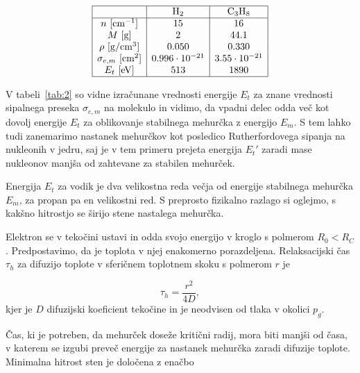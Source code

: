 \begin{table}
\label{tab:2}
  \centering
\[
    \begin{array}{|c|c|c|} \hline
      & \mathrm{H}_2 & \mathrm{C}_3 \mathrm{H}_8 \\ \hline
      n \ [ \mathrm{cm}^{-1}] & 15 & 16 \\
      M \ [\mathrm{g}] & 2 & 44.1 \\
      \rho \ [\mathrm{g}/ \mathrm{cm}^3] & 0.050 & 0.330 \\
      \sigma_{e,m} \ [ \mathrm{cm} ^2 ] & 0.996 \cdot 10^{-21} & 3.55 \cdot 10^{-21} \\
      E_t \ [ \mathrm{eV}] & 513 & 1890 \\ \hline
    \end{array}
\]
\end{table}

V tabeli~\ref{tab:2} so vidne izračunane vrednosti energije \( E_t \) za znane vrednosti sipalnega preseka \( \sigma_{e, m} \) na molekulo in vidimo, da vpadni delec odda več kot dovolj energije \( E_t \) za oblikovanje stabilnega mehurčka z energijo \( E_m \). S tem lahko tudi zanemarimo nastanek mehurčkov kot posledico Rutherfordovega sipanja na nukleonih v jedru, saj je v tem primeru prejeta energija \( E_t' \) zaradi mase nukleonov manjša od zahtevane za stabilen mehurček.

Energija \( E_t \) za vodik je dva velikostna reda večja od energije stabilnega mehurčka \( E_m \), za propan pa en velikostni red. S preprosto fizikalno razlago si oglejmo, s kakšno hitrostjo se širijo stene nastalega mehurčka.

Elektron se v tekočini ustavi in odda svojo energijo v kroglo s polmerom \( R_0 < R_C \). Predpostavimo, da je toplota v njej enakomerno porazdeljena. Relaksacijski čas \( \tau_h \) za difuzijo toplote v sferičnem toplotnem skoku s polmerom \( r \) je

\[  \tau_h = \frac{r ^2}{4 D},
\]
kjer je \( D \) difuzijski koeficient tekočine in je neodvisen od tlaka v okolici \( p_g \).

Čas, ki je potreben, da mehurček doseže kritični radij, mora biti manjši od časa, v katerem se izgubi preveč energije za nastanek mehurčka zaradi difuzije toplote. Minimalna hitrost sten je določena z enačbo

